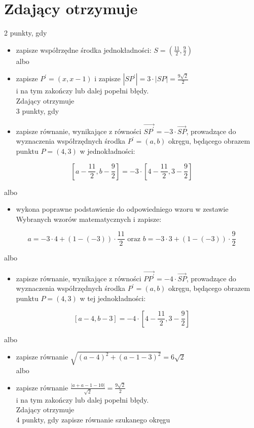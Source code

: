 \documentclass[10pt]{article}
\begin{document}
\section*{Zdający otrzymuje}
2 punkty, gdy

\begin{itemize}
  \item zapisze współrzędne środka jednokładności: $S=\left(\frac{11}{2}, \frac{9}{2}\right)$\\
albo
  \item zapisze $P^{\prime}=(x, x-1)$ i zapisze $\left|S P^{\prime}\right|=3 \cdot|S P|=\frac{9 \sqrt{2}}{2}$\\
i na tym zakończy lub dalej popełni błędy.\\
Zdający otrzymuje\\
3 punkty, gdy
  \item zapisze równanie, wynikające z równości $\overrightarrow{S P^{\prime}}=-3 \cdot \overrightarrow{S P}$, prowadzące do wyznaczenia współrzędnych środka $P^{\prime}=(a, b)$ okręgu, będącego obrazem punktu $P=(4,3)$ w jednokładności:
\end{itemize}

$$
\left[a-\frac{11}{2}, b-\frac{9}{2}\right]=-3 \cdot\left[4-\frac{11}{2}, 3-\frac{9}{2}\right]
$$

albo

\begin{itemize}
  \item wykona poprawne podstawienie do odpowiedniego wzoru w zestawie Wybranych wzorów matematycznych i zapisze:
\end{itemize}

$$
a=-3 \cdot 4+(1-(-3)) \cdot \frac{11}{2} \text { oraz } b=-3 \cdot 3+(1-(-3)) \cdot \frac{9}{2}
$$

albo

\begin{itemize}
  \item zapisze równanie, wynikające z równości $\overrightarrow{P P^{\prime}}=-4 \cdot \overrightarrow{S P}$, prowadzące do wyznaczenia współrzędnych środka $P^{\prime}=(a, b)$ okręgu, będącego obrazem punktu $P=(4,3)$ w tej jednokładności:
\end{itemize}

$$
[a-4, b-3]=-4 \cdot\left[4-\frac{11}{2}, 3-\frac{9}{2}\right]
$$

albo

\begin{itemize}
  \item zapisze równanie $\sqrt{(a-4)^{2}+(a-1-3)^{2}}=6 \sqrt{2}$\\
albo
  \item zapisze równanie $\frac{|a+a-1-10|}{\sqrt{2}}=\frac{9 \sqrt{2}}{2}$\\
i na tym zakończy lub dalej popełni błędy.\\
Zdający otrzymuje\\
4 punkty, gdy zapisze równanie szukanego okręgu
\end{itemize}
\end{document}
